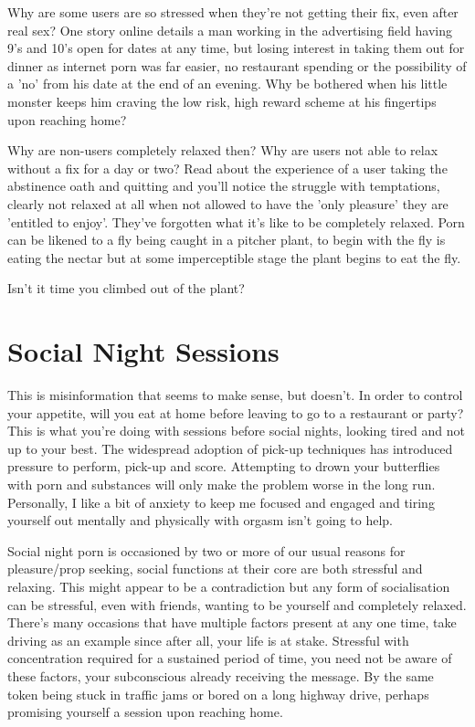 \documentclass[easypeasy.tex]{subfiles}
\begin{document}
Why are some users are so stressed when they're not getting their fix, even after real sex? One story online details a man working in the advertising field having 9's and 10's open for dates at any time, but losing interest in taking them out for dinner as internet porn was far easier, no restaurant spending or the possibility of a 'no' from his date at the end of an evening. Why be bothered when his little monster keeps him craving the low risk, high reward scheme at his fingertips upon reaching home?

Why are non-users completely relaxed then? Why are users not able to relax without a fix for a day or two? Read about the experience of a user taking the abstinence oath and quitting and you'll notice the struggle with temptations, clearly not relaxed at all when not allowed to have the 'only pleasure' they are 'entitled to enjoy'. They've forgotten what it's like to be completely relaxed. Porn can be likened to a fly being caught in a pitcher plant, to begin with the fly is eating the nectar but at some imperceptible stage the plant begins to eat the fly.

Isn't it time you climbed out of the plant?

\section{Social Night Sessions}

This is misinformation that seems to make sense, but doesn't. In order to control your appetite, will you eat at home before leaving to go to a restaurant or party? This is what you're doing with sessions before social nights, looking tired and not up to your best. The widespread adoption of pick-up techniques has introduced pressure to perform, pick-up and score. Attempting to drown your butterflies with porn and substances will only make the problem worse in the long run. Personally, I like a bit of anxiety to keep me focused and engaged and tiring yourself out mentally and physically with orgasm isn't going to help.

Social night porn is occasioned by two or more of our usual reasons for pleasure/prop seeking, social functions at their core are both stressful and relaxing. This might appear to be a contradiction but any form of socialisation can be stressful, even with friends, wanting to be yourself and completely relaxed. There's many occasions that have multiple factors present at any one time, take driving as an example since after all, your life is at stake. Stressful with concentration required for a sustained period of time, you need not be aware of these factors, your subconscious already receiving the message. By the same token being stuck in traffic jams or bored on a long highway drive, perhaps promising yourself a session upon reaching home.
\end{document}
